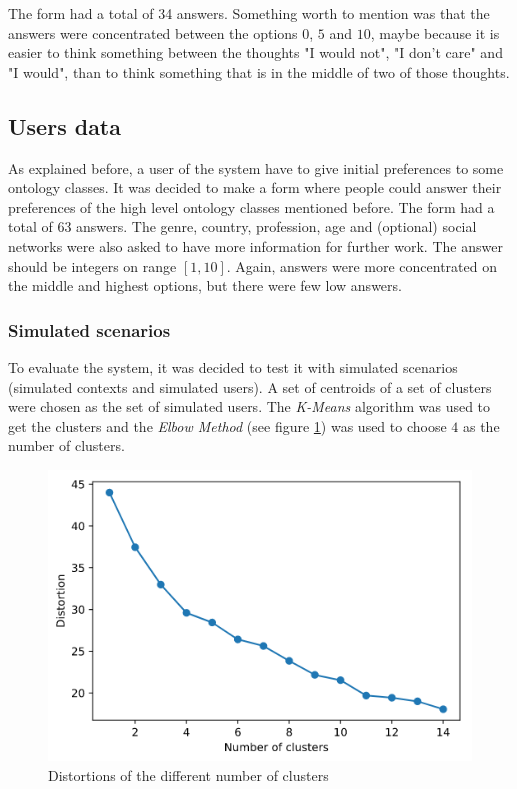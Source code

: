 The form had a total of 34 answers. Something worth to mention was that the answers were concentrated between the options $0$, $5$ and $10$, maybe because it is easier to think something between the thoughts "I would not", "I don't care" and "I would", than to think something that is in the middle of two of those thoughts.

\subsection{Users data}
As explained before, a user of the system have to give initial preferences to some ontology classes. It was decided to make a form where people could answer their preferences of the high level ontology classes mentioned before. The form had a total of 63 answers. The genre, country, profession, age and (optional) social networks were also asked to have more information for further work. The answer should be integers on range $[1, 10]$. Again, answers were more concentrated on the middle and highest options, but there were few low answers.

\subsubsection{Simulated scenarios}
To evaluate the system, it was decided to test it with simulated scenarios (simulated contexts and simulated users). A set of centroids of a set of clusters were chosen as the set of simulated users. The \textit{K-Means} algorithm was used to get the clusters and the \textit{Elbow Method} (see figure \ref{fig:elbow}) was used to choose $4$ as the number of clusters.
\begin{figure}[h]
    \centering
    \includegraphics[scale=0.45]{elbow.png}
    \caption{Distortions of the different number of clusters}
    \label{fig:elbow}
\end{figure}

